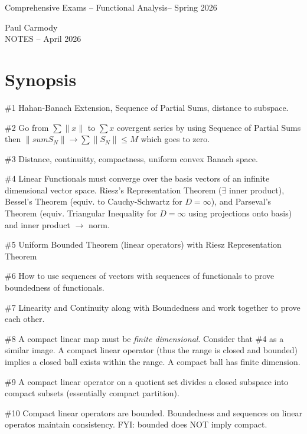 \documentclass[12pt,a4paper]{report}
\newcommand{\CLASSNAME}{Comprehensive Exams -- Functional Analysis}
\newcommand{\STUDENTNAME}{Paul Carmody}
\newcommand{\ASSIGNMENT}{NOTES }
\newcommand{\DUEDATE}{April 2026}
\newcommand{\SEMESTER}{Spring 2026}
\begin{document}
\begin{center}
	\Large{\CLASSNAME -- \SEMESTER} 
\end{center}
\begin{center}
	\STUDENTNAME \\
	\ASSIGNMENT -- \DUEDATE\\
\end{center} 
\section*{Synopsis}

\begin{description}

\item \#1 Hahan-Banach Extension, Sequence of Partial Sums, distance to subspace.

\item \#2 Go from $\sum \|x\|$ to $\sum x$ covergent series by using Sequence of Partial Sums then $\|sum S_N\| \to \sum \|S_N\| \le M$ which goes to zero.

\item \#3 Distance, continuitty, compactness, uniform convex Banach space.

\item \#4 Linear Functionals must converge over the basis vectors of an infinite dimensional vector space.  Riesz's Representation Theorem ($\exists$ inner product), Bessel's Theorem (equiv. to Cauchy-Schwartz for $D=\infty$), and Parseval's Theorem (equiv. Triangular Inequality for $D=\infty$ using projections onto basis) and inner product $\to$ norm.

\item \#5 Uniform Bounded Theorem (linear operators) with Riesz Representation Theorem

\item \#6 How to use sequences of vectors with sequences of functionals to prove boundedness of functionals.

\item \#7 Linearity and Continuity along with Boundedness and work together to prove each other.

\item \#8 A compact linear map must be \textit{finite dimensional}.  Consider that \#4 as a similar image.  A compact linear operator (thus the range is closed and bounded) implies a closed ball exists within the range.  A compact ball has finite dimension.

\item \#9 A compact linear operator on a quotient set divides a closed subspace into compact subsets (essentially compact partition).

\item \#10 Compact linear operators are bounded.  Boundedness and sequences on linear operatos maintain consistency. FYI: bounded does NOT imply compact.

\end{description}
\end{document}
